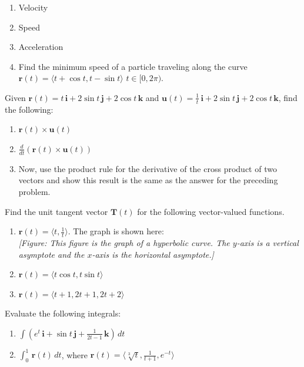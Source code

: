 \documentclass{exercises}
\begin{document}
\begin{enumerate}[resume]
\item Velocity
\item Speed
\item Acceleration
\item Find the minimum speed of a particle traveling along the curve $\mathbf{r}(t)=\langle t+\cos t,t-\sin t\rangle$ $t\in[0,2\pi)$.
\end{enumerate}

Given $\mathbf{r}(t)=t\,\mathbf{i}+2\sin t\,\mathbf{j}+2\cos t\,\mathbf{k}$ and $\mathbf{u}(t)=\frac{1}{t}\,\mathbf{i}+2\sin t\,\mathbf{j}+2\cos t\,\mathbf{k}$, find the following:

\begin{enumerate}[resume]
\item $\mathbf{r}(t)\times \mathbf{u}(t)$
\item $\frac{d}{dt}(\mathbf{r}(t)\times \mathbf{u}(t))$
\item Now, use the product rule for the derivative of the cross product of two vectors and show this result is the same as the answer for the preceding problem.
\end{enumerate}

Find the unit tangent vector $\mathbf{T}(t)$ for the following vector-valued functions.

\begin{enumerate}[resume]
\item $\mathbf{r}(t)=\langle t,\frac{1}{t}\rangle$. The graph is shown here: \\ \textit{[Figure: This figure is the graph of a hyperbolic curve. The $y$-axis is a vertical asymptote and the $x$-axis is the horizontal asymptote.]}
\item $\mathbf{r}(t)=\langle t\cos t,t\sin t\rangle$
\item $\mathbf{r}(t)=\langle t+1,2t+1,2t+2\rangle$
\end{enumerate}

Evaluate the following integrals:

\begin{enumerate}[resume]
\item $\int(e^{t}\,\mathbf{i}+\sin t\,\mathbf{j}+\frac{1}{2t-1}\,\mathbf{k})\,dt$
\item $\int_{0}^{1}\,\mathbf{r}(t)\,dt$, where $\mathbf{r}(t)=\langle \sqrt[3]{t},\frac{1}{t+1},e^{-t}\rangle$
\end{enumerate}
\end{document}
